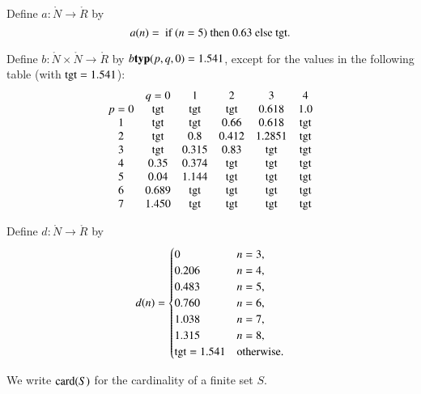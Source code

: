 \begin{definition}[a]
  Define $a:\ring{N}\to \ring{R}$ by
  $$
  a(n) = \hbox{ if } (n=5) \hbox{ then } 0.63 \hbox{ else } {\operatorname{tgt}}.
  $$
\end{definition}

\begin{definition}[b]
  Define $b:\ring{N}\times \ring{N}\to \ring{R}$ by $b{\operatorname{\bf typ}}{(p,q,0)}=1.541$,
  except for the values in the following table
  (with  ${\operatorname{tgt}}=1.541$):
  {
  \def\tx{\op{tgt}}
  $$\begin{matrix}  &q=0&1&2&3&4\\
           p=0&\tx&\tx&\tx&0.618&1.0\\
           1&\tx&\tx&0.66&0.618&\tx\\
           2&\tx&0.8&0.412&1.2851&\tx\\
           3&\tx&0.315&0.83&\tx&\tx\\
           4&0.35&0.374&\tx&\tx&\tx\\
           5&0.04&1.144&\tx&\tx&\tx\\
           6&0.689&\tx&\tx&\tx&\tx\\
           7&1.450&\tx&\tx&\tx&\tx
   \end{matrix}
   $$
   }
\end{definition}


\begin{definition}[d]
    Define $d:\ring{N}\to \ring{R}$ by
  $$d(n) = \begin{cases}
    0 & n=3, \\
    0.206 & n=4, \\
    0.483 & n=5, \\
    0.760 & n=6, \\
    1.038 & n=7, \\
    1.315 & n=8,\\
    {\operatorname{tgt}}=1.541 & \text{otherwise}.
  \end{cases}
  $$
\end{definition}


We write ${\operatorname{card}}(S)$ for the cardinality of a finite set $S$.


